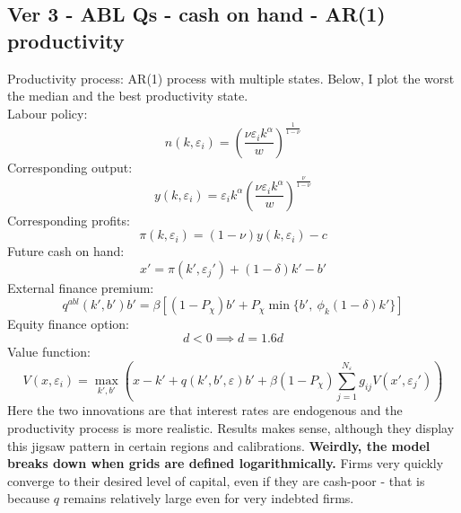 \documentclass[12pt]{article}
\begin{document}
\subsection*{Ver 3 - ABL Qs - cash on hand - AR(1) productivity}
Productivity process: AR(1) process with multiple states. Below, I plot the worst the median and the best productivity state. \vspace{3mm} \\
Labour policy: 
\begin{equation}
    n(k,\varepsilon_i) = \left( \dfrac{ \nu \varepsilon_i k^\alpha}{w} \right)^{\frac{1}{1-\nu}}
\end{equation}
Corresponding output: 
\begin{equation}
    y(k,\varepsilon_i) = \varepsilon_i k^{\alpha} \left( \dfrac{\nu \varepsilon_i k^\alpha}{w} \right)^{\frac{\nu}{1-\nu}}
\end{equation}
Corresponding profits: 
\begin{equation}
    \pi(k,\varepsilon_i) = (1-\nu) y(k,\varepsilon_i) - c
\end{equation}
Future cash on hand: 
\begin{equation}
   x' = \pi(k',\varepsilon_j')+(1-\delta)k'-b'
\end{equation}
External finance premium:
\begin{equation}
    q^{abl}(k',b')b' = \beta \left[ (1-P_\chi) b' + P_\chi \min\{b', \ \phi_k (1-\delta) k' \} \right]  
\end{equation}
Equity finance option:
\begin{equation}
    d < 0 \implies d = 1.6d
\end{equation}
Value function:
\begin{equation}
     V(x, \varepsilon_i) = \max_{k',b'}  \left( x - k' +  q(k',b',\varepsilon) b' +
            \beta (1-P_\chi) \sum_{j=1}^{N_\varepsilon} g_{ij}  V(x',\varepsilon_j') \right)
\end{equation}
Here the two innovations are that interest rates are endogenous and the productivity process is more realistic. Results makes sense, although they display this jigsaw pattern in certain regions and calibrations. \textbf{Weirdly, the model breaks down when grids are defined logarithmically.} Firms very quickly converge to their desired level of capital, even if they are cash-poor - that is because $q$ remains relatively large even for very indebted firms.
\end{document}
